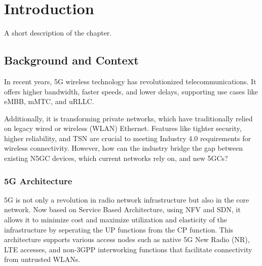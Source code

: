\chapter{Introduction}%
\label{chapter:introduction}

\begin{introduction}
A short description of the chapter.
\end{introduction}

\section{Background and Context}


In recent years, \ac{5G} wireless technology has revolutionized telecommunications. It offers higher bandwidth, faster speeds, and lower delays, supporting use cases like \ac{eMBB}, \ac{mMTC}, and \ac{uRLLC}.

Additionally, it is transforming private networks, which have traditionally relied on legacy wired or wireless (WLAN) Ethernet. Features like tighter security, higher reliability, and \ac{TSN} are crucial to meeting Industry 4.0 requirements for wireless connectivity. However, how can the industry bridge the gap between existing \ac{N5GC} devices, which current networks rely on, and new \acp{5GC}?

\subsection{5G Architecture}


5G is not only a revolution in radio network infrastructure but also in the core network. Now based on Service Based Architecture, using \ac{NFV} and \ac{SDN}, it allows it to minimize cost and maximize utilization and elasticity of the infrastructure by seperating the \ac{UP} functions from the \ac{CP} function. This architecture supports various access nodes such as native 5G New Radio (NR), LTE accesses, and non-3GPP interworking functions that facilitate connectivity from untrusted WLANs.\cite{23.501}


